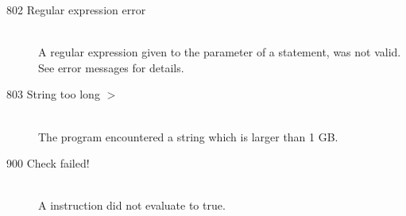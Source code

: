 \begin{description}
\item[802 Regular expression error]\ \\
  A regular expression given to the  parameter of a
   statement, was not valid. See error messages for details.
\item[803 String too long  $>$ ]\ \\
  The program encountered a string which is larger than 1 GB. 
%
%
\item[900 Check failed!]\ \\
  A  instruction did not evaluate to true. 
\end{description}

